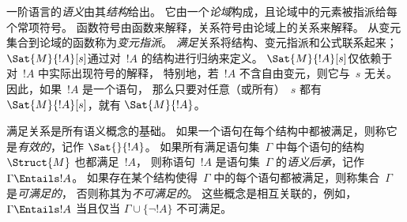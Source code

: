 一阶语言的\emph{语义}由其\emph{结构}给出。
它由一个\emph{论域}构成，且论域中的元素被指派给每个常项符号。
函数符号由函数来解释，关系符号由论域上的关系来解释。
从变元集合到论域的函数称为\emph{变元指派}。
\emph{满足}关系将结构、变元指派和公式联系起来；
$\Sat{M}{!A}[s]$通过对~$!A$ 的结构进行归纳来定义。
$\Sat{M}{!A}[s]$仅依赖于对~$!A$ 中实际出现符号的解释，
特别地，若~$!A$ 不含自由变元，则它与~$s$ 无关。
因此，如果~$!A$ 是一个语句，
那么只要对任意（或所有）~$s$ 都有 $\Sat{M}{!A}[s]$，就有 $\Sat{M}{!A}$。

满足关系是所有语义概念的基础。
如果一个语句在每个结构中都被满足，则称它是\emph{有效的}，记作 $\Sat{{}}{!A}$。
如果所有满足语句集~$\Gamma$ 中每个语句的结构~$\Struct{M}$ 也都满足~$!A$，
则称语句~$!A$ 是语句集~$\Gamma$ 的\emph{语义后承}，记作 $\Gamma \Entails !A$。
如果存在某个结构使得~$\Gamma$ 中的每个语句都被满足，则称集合~$\Gamma$ 是\emph{可满足的}，
否则称其为\emph{不可满足的}。
这些概念是相互关联的，例如，$\Gamma \Entails !A$ 当且仅当 $\Gamma \cup \{\lnot
!A\}$ 不可满足。